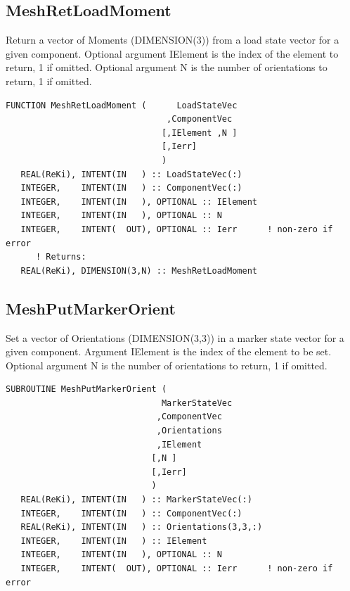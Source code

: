 \documentclass[11pt]{article}
\begin{document}
\subsection{MeshRetLoadMoment}
Return a vector of Moments (DIMENSION(3)) from a load state vector for a given component.
Optional argument IElement is the index of the element to return, 1 if omitted.
Optional argument N is the number of orientations to return, 1 if omitted.
\begin{verbatim}
FUNCTION MeshRetLoadMoment (      LoadStateVec
                                ,ComponentVec 
                               [,IElement ,N ]
                               [,Ierr]
                               )
   REAL(ReKi), INTENT(IN   ) :: LoadStateVec(:)
   INTEGER,    INTENT(IN   ) :: ComponentVec(:)
   INTEGER,    INTENT(IN   ), OPTIONAL :: IElement
   INTEGER,    INTENT(IN   ), OPTIONAL :: N
   INTEGER,    INTENT(  OUT), OPTIONAL :: Ierr 		! non-zero if error
      ! Returns:
   REAL(ReKi), DIMENSION(3,N) :: MeshRetLoadMoment
\end{verbatim}

\subsection{MeshPutMarkerOrient}
Set a vector of Orientations (DIMENSION(3,3)) in a marker state vector for a given component.
Argument IElement is the index of the element to be set.
Optional argument N is the number of orientations to return, 1 if omitted.
\begin{verbatim}
SUBROUTINE MeshPutMarkerOrient ( 
                               MarkerStateVec
                              ,ComponentVec 
                              ,Orientations
                              ,IElement
                             [,N ]
                             [,Ierr]
                             )
   REAL(ReKi), INTENT(IN   ) :: MarkerStateVec(:)
   INTEGER,    INTENT(IN   ) :: ComponentVec(:)
   REAL(ReKi), INTENT(IN   ) :: Orientations(3,3,:)
   INTEGER,    INTENT(IN   ) :: IElement
   INTEGER,    INTENT(IN   ), OPTIONAL :: N
   INTEGER,    INTENT(  OUT), OPTIONAL :: Ierr 		! non-zero if error
\end{verbatim}
\end{document}
